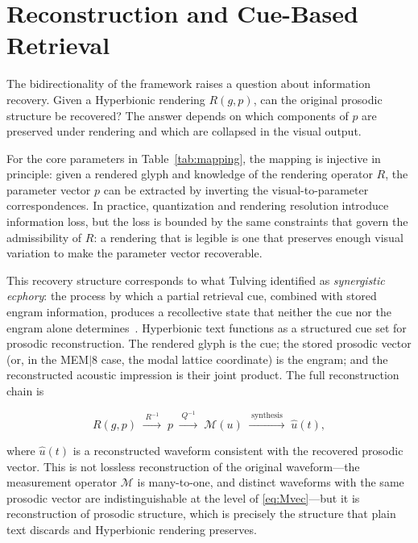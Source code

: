 \documentclass[12pt, a4paper]{article}
\begin{document}
\section{Reconstruction and Cue-Based Retrieval}

The bidirectionality of the framework raises a question about information recovery. Given a Hyperbionic rendering $R(g, p)$, can the original prosodic structure be recovered? The answer depends on which components of $p$ are preserved under rendering and which are collapsed in the visual output.

For the core parameters in Table~\ref{tab:mapping}, the mapping is injective in principle: given a rendered glyph and knowledge of the rendering operator $R$, the parameter vector $p$ can be extracted by inverting the visual-to-parameter correspondences. In practice, quantization and rendering resolution introduce information loss, but the loss is bounded by the same constraints that govern the admissibility of $R$: a rendering that is legible is one that preserves enough visual variation to make the parameter vector recoverable.

This recovery structure corresponds to what Tulving identified as \emph{synergistic ecphory}: the process by which a partial retrieval cue, combined with stored engram information, produces a recollective state that neither the cue nor the engram alone determines~\cite{Tulving1982}. Hyperbionic text functions as a structured cue set for prosodic reconstruction. The rendered glyph is the cue; the stored prosodic vector (or, in the MEM$|$8 case, the modal lattice coordinate) is the engram; and the reconstructed acoustic impression is their joint product. The full reconstruction chain is

\begin{equation}
R(g, p) \;\xrightarrow{\;R^{-1}\;}\; p \;\xrightarrow{\;Q^{-1}\;}\; \mathcal{M}(u) \;\xrightarrow{\;\text{synthesis}\;}\; \hat{u}(t),
\label{eq:recon}
\end{equation}

where $\hat{u}(t)$ is a reconstructed waveform consistent with the recovered prosodic vector. This is not lossless reconstruction of the original waveform---the measurement operator $\mathcal{M}$ is many-to-one, and distinct waveforms with the same prosodic vector are indistinguishable at the level of \eqref{eq:Mvec}---but it is reconstruction of prosodic structure, which is precisely the structure that plain text discards and Hyperbionic rendering preserves.
\end{document}
